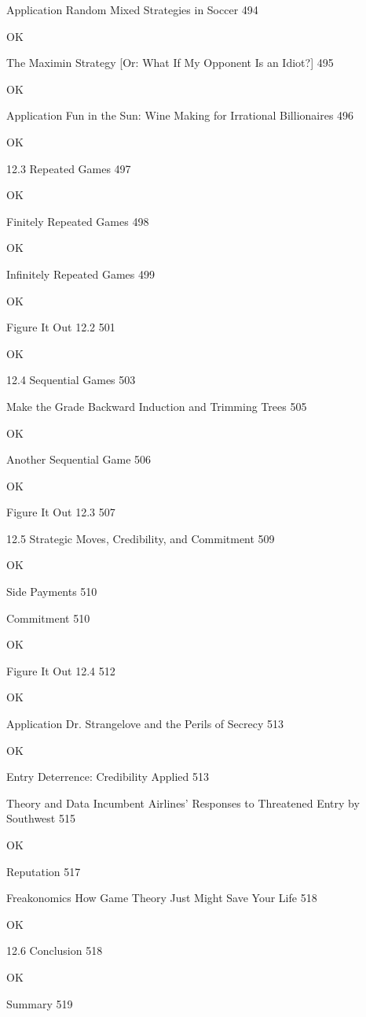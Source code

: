 Application Random Mixed Strategies in Soccer 494

OK

The Maximin Strategy [Or: What If My Opponent Is an Idiot?] 495

OK

Application Fun in the Sun: Wine Making for Irrational Billionaires 496

OK

12.3 Repeated Games 497

OK

Finitely Repeated Games 498

OK

Infinitely Repeated Games 499

OK

Figure It Out 12.2 501

OK

12.4 Sequential Games 503



Make the Grade Backward Induction and Trimming Trees 505

OK

Another Sequential Game 506

OK

Figure It Out 12.3 507



12.5 Strategic Moves, Credibility, and Commitment 509

OK

Side Payments 510



Commitment 510

OK

Figure It Out 12.4 512

OK

Application Dr. Strangelove and the Perils of Secrecy 513

OK

Entry Deterrence: Credibility Applied 513



Theory and Data Incumbent Airlines' Responses to Threatened Entry by Southwest 515

OK

Reputation 517



Freakonomics How Game Theory Just Might Save Your Life 518

OK

12.6 Conclusion 518

OK

Summary 519

